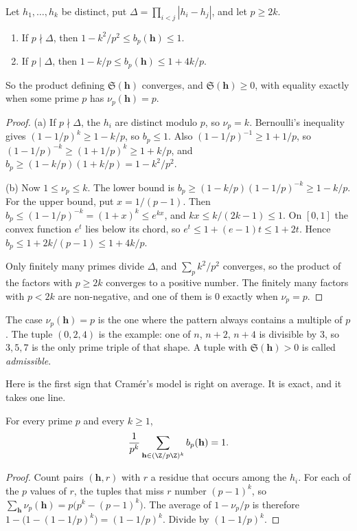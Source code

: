\begin{lemma}\label{lem:bp}
Let $h_1,\dots,h_k$ be distinct, put $\Delta=\prod_{i<j}|h_i-h_j|$, and let $p\ge2k$.
\begin{enumerate}[label=(\alph*)]
\item If $p\nmid\Delta$, then $1-k^2/p^2\le b_p(\mathbf h)\le1$.
\item If $p\mid\Delta$, then $1-k/p\le b_p(\mathbf h)\le1+4k/p$.
\end{enumerate}
So the product defining $\mathfrak S(\mathbf h)$ converges, and $\mathfrak S(\mathbf h)\ge0$, with equality exactly when some prime $p$ has $\nu_p(\mathbf h)=p$.
\end{lemma}
\begin{proof}
(a) If $p\nmid\Delta$, the $h_i$ are distinct modulo $p$, so $\nu_p=k$. Bernoulli's inequality gives $(1-1/p)^k\ge1-k/p$, so $b_p\le1$. Also $(1-1/p)^{-1}\ge1+1/p$, so $(1-1/p)^{-k}\ge(1+1/p)^k\ge1+k/p$, and $b_p\ge(1-k/p)(1+k/p)=1-k^2/p^2$.

(b) Now $1\le\nu_p\le k$. The lower bound is $b_p\ge(1-k/p)(1-1/p)^{-k}\ge1-k/p$. For the upper bound, put $x=1/(p-1)$. Then $b_p\le(1-1/p)^{-k}=(1+x)^k\le e^{kx}$, and $kx\le k/(2k-1)\le1$. On $[0,1]$ the convex function $e^t$ lies below its chord, so $e^t\le1+(e-1)t\le1+2t$. Hence $b_p\le1+2k/(p-1)\le1+4k/p$.

Only finitely many primes divide $\Delta$, and $\sum_pk^2/p^2$ converges, so the product of the factors with $p\ge2k$ converges to a positive number. The finitely many factors with $p<2k$ are non-negative, and one of them is $0$ exactly when $\nu_p=p$.
\end{proof}

The case $\nu_p(\mathbf h)=p$ is the one where the pattern always contains a multiple of $p$. The tuple $(0,2,4)$ is the example: one of $n$, $n+2$, $n+4$ is divisible by $3$, so $3,5,7$ is the only prime triple of that shape. A tuple with $\mathfrak S(\mathbf h)>0$ is called \emph{admissible}.

Here is the first sign that Cram\'er's model is right on average. It is exact, and it takes one line.

\begin{lemma}\label{lem:localavg}
For every prime $p$ and every $k\ge1$,
\[
\frac1{p^k}\sum_{\mathbf h\in(\Z/p\Z)^k}b_p(\mathbf h)=1.
\]
\end{lemma}
\begin{proof}
Count pairs $(\mathbf h,r)$ with $r$ a residue that occurs among the $h_i$. For each of the $p$ values of $r$, the tuples that miss $r$ number $(p-1)^k$, so $\sum_{\mathbf h}\nu_p(\mathbf h)=p\bigl(p^k-(p-1)^k\bigr)$. The average of $1-\nu_p/p$ is therefore $1-\bigl(1-(1-1/p)^k\bigr)=(1-1/p)^k$. Divide by $(1-1/p)^k$.
\end{proof}

